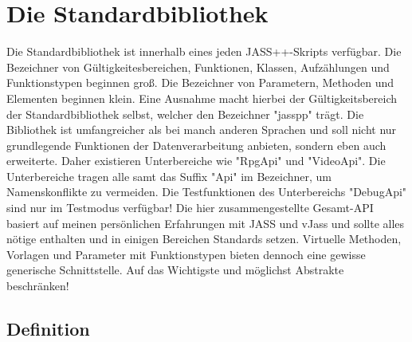\chapter{Die Standardbibliothek}
Die Standardbibliothek ist innerhalb eines jeden JASS++-Skripts verfügbar.
Die Bezeichner von Gültigkeitesbereichen, Funktionen, Klassen, Aufzählungen und Funktionstypen beginnen groß. Die Bezeichner von Parametern, Methoden und Elementen
beginnen klein.
Eine Ausnahme macht hierbei der Gültigkeitsbereich der Standardbibliothek selbst, welcher den Bezeichner "jasspp" trägt.
Die Bibliothek ist umfangreicher als bei manch anderen Sprachen und soll nicht nur grundlegende Funktionen der Datenverarbeitung anbieten, sondern eben auch
erweiterte.
Daher existieren Unterbereiche wie "RpgApi" und "VideoApi".
Die Unterbereiche tragen alle samt das Suffix "Api" im Bezeichner, um Namenskonflikte zu vermeiden.
Die Testfunktionen des Unterbereichs "DebugApi" sind nur im Testmodus verfügbar!
Die hier zusammengestellte Gesamt-API basiert auf meinen persönlichen Erfahrungen mit JASS und vJass und sollte alles nötige enthalten und in einigen Bereichen
Standards setzen. Virtuelle Methoden, Vorlagen und Parameter mit Funktionstypen bieten dennoch eine gewisse generische Schnittstelle.
Auf das Wichtigste und möglichst Abstrakte beschränken!

\section{Definition}
